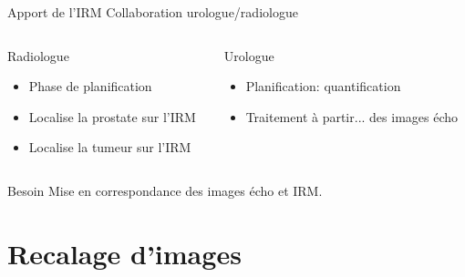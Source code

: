\documentclass{beamer}
\begin{document}
\begin{frame}{Apport de l'IRM}
  \centering
Collaboration urologue/radiologue
  \begin{columns}[T]
 \begin{column}{0.5\textwidth}
\begin{block}{Radiologue}
\begin{itemize}
  \item Phase de planification
  \item Localise la prostate sur l'IRM
  \item Localise la tumeur sur l'IRM
  \end{itemize}
\end{block}
 \end{column}
 \begin{column}{0.5\textwidth}
\begin{block}{Urologue}
\begin{itemize}
  \item Planification: quantification
  \item Traitement à partir... des images écho
  \end{itemize}
\end{block}
\end{column}
\end{columns}
\begin{exampleblock}{Besoin}
Mise en correspondance des images écho et IRM.
\end{exampleblock}
\end{frame}

\section{Recalage d'images}
\end{document}
